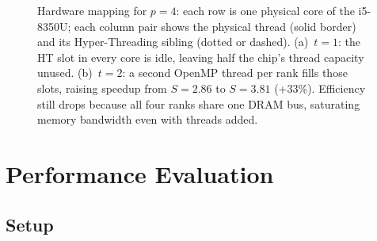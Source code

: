 \documentclass[12pt,a4paper]{article}
\begin{document}
\begin{figure}[H]
\caption{Hardware mapping for $p{=}4$: each row is one physical core of the
  i5-8350U; each column pair shows the physical thread (solid border) and its
  Hyper-Threading sibling (dotted or dashed).
  (a)~$t{=}1$: the HT slot in every core is idle, leaving half the chip's
  thread capacity unused. (b)~$t{=}2$: a second OpenMP thread per rank fills
  those slots, raising speedup from $S=2.86$ to $S=3.81$ (+33\%). Efficiency
  still drops because all four ranks share one DRAM bus, saturating memory
  bandwidth even with threads added.}
\label{fig:mapping}
\end{figure}

\section{Performance Evaluation}
\label{sec:perf}

\subsection{Setup}
\end{document}
